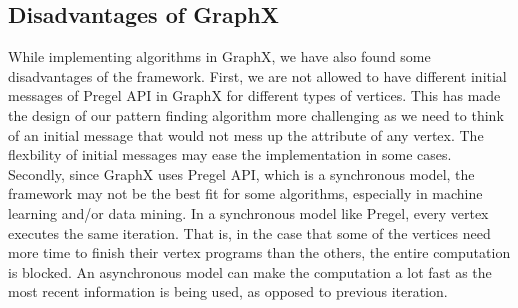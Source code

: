 \subsection{Disadvantages of GraphX}
%
While implementing algorithms in GraphX, we have also found some disadvantages of the framework.
%
First, we are not allowed to have different initial messages of Pregel API in GraphX for different types of vertices.
%
This has made the design of our pattern finding algorithm more challenging as we need to think of an initial message that would not mess up the attribute of any vertex.
%
The flexbility of initial messages may ease the implementation in some cases.
%
Secondly, since GraphX uses Pregel API, which is a synchronous model, the framework may not be the best fit for some algorithms, especially in machine learning and/or data mining.
%
In a synchronous model like Pregel, every vertex executes the same iteration.
%
That is, in the case that some of the vertices need more time to finish their vertex programs than the others, the entire computation is blocked.
%
An asynchronous model can make the computation a lot fast as the most recent information is being used, as opposed to previous iteration.
%
